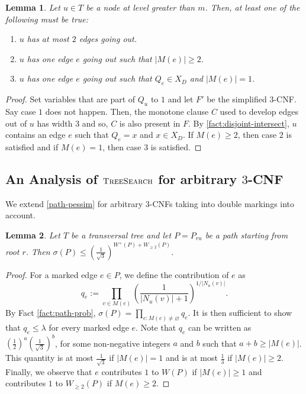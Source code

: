 \documentclass[10pt,a4paper]{article}
\let\emptyset\varnothing
\newtheorem{lemma}{Lemma}
\newcommand{\total}{\sigma}
\newcommand{\ts}{\textsc{TreeSearch}}
\begin{document}
\begin{lemma}
\label{lemma:disjoint-marking}
Let $u\in T$ be a node at level greater than $m$. Then, at least one of the following must be true:
\begin{enumerate}
  \item
  $u$ has at most $2$ edges going out. 

  \item
  $u$ has one edge $e$ going out such that $|M(e)| \ge 2$.

  \item
  $u$ has one edge $e$ going out such that $Q_e\in X_D$ and $|M(e)| = 1$.
\end{enumerate}
\end{lemma}

\begin{proof}
Set variables that are part of $Q_u$ to $1$ and let $F'$ be the simplified $3$-CNF.
Say case $1$ does not happen. Then, the monotone clause $C$ used to develop edges out of $u$ has width $3$ and so, $C$ is also present in $F$. By \cref{fact:disjoint-intersect}, $u$ contains an edge $e$ such that $Q_e = x$ and $x\in X_D$. If $M(e) \ge 2$, then case $2$ is satisfied and if $M(e) = 1$, then case $3$ is satisfied.
\end{proof}


\subsection{An Analysis of $\ts$ for arbitrary $3$-CNF}

We extend \cref{path-pessim} for arbitrary $3$-CNFs taking into double markings into account.

\begin{lemma}
\label{lemma:double-marking-weight}
Let $T$ be a transversal tree and let $P = P_{ru}$ be a path starting from root $r$. Then $\sigma(P) \le (\frac{1}{\sqrt{3}})^{W^{+}(P) + W_{\ge 2}(P)}$.
\end{lemma}

\begin{proof}
For a marked edge $e \in P$, we define the contribution of $e$ as
\[
q_e := \prod_{v \in M(e)}\left(\frac{1}{|N_u(v)|+1}\right)^{1/|N_u(v)|}.
\]
By Fact \ref{fact:path-prob}, $\total(P) = \prod_{e : M(e) \ne \emptyset} q_e$. It is then sufficient to show that $q_e \le \lambda$ for every marked edge $e$. Note that $q_e$ can be written as $(\frac{1}{2})^a (\frac{1}{\sqrt{3}})^b$, for some non-negative integers $a$ and $b$ such that $a + b \ge |M(e)|$. This quantity is at most $\frac{1}{\sqrt{3}}$ if $|M(e)| = 1$ and is at most $\frac{1}{3}$ if $|M(e)| \ge 2$. Finally, we observe that $e$ contributes $1$ to $W(P)$ if $|M(e)| \ge 1$ and contributes $1$ to $W_{\ge 2}(P)$ if $M(e) \ge 2$.
\end{proof}
\end{document}
